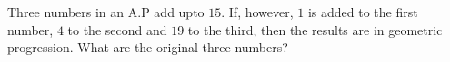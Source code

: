 
%
%
%
%
% 
% 

\question[4] Three numbers in an A.P add upto $15$. If, however, $1$ is added to the first number,
$4$ to the second and $19$ to the third, then the results are in geometric progression. What are 
the original three numbers?


\ifprintanswers

\fi 

